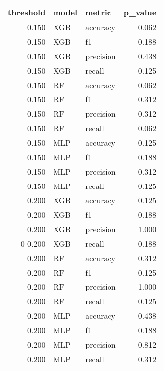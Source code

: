 \begin{tabular}{rllr}
\toprule
threshold & model & metric & p_value \\
\midrule
0.150 & XGB & accuracy & 0.062 \\
0.150 & XGB & f1 & 0.188 \\
0.150 & XGB & precision & 0.438 \\
0.150 & XGB & recall & 0.125 \\
0.150 & RF & accuracy & 0.062 \\
0.150 & RF & f1 & 0.312 \\
0.150 & RF & precision & 0.312 \\
0.150 & RF & recall & 0.062 \\
0.150 & MLP & accuracy & 0.125 \\
0.150 & MLP & f1 & 0.188 \\
0.150 & MLP & precision & 0.312 \\
0.150 & MLP & recall & 0.125 \\
0.200 & XGB & accuracy & 0.125 \\
0.200 & XGB & f1 & 0.188 \\
0.200 & XGB & precision & 1.000 \\0
0.200 & XGB & recall & 0.188 \\
0.200 & RF & accuracy & 0.312 \\
0.200 & RF & f1 & 0.125 \\
0.200 & RF & precision & 1.000 \\
0.200 & RF & recall & 0.125 \\
0.200 & MLP & accuracy & 0.438 \\
0.200 & MLP & f1 & 0.188 \\
0.200 & MLP & precision & 0.812 \\
0.200 & MLP & recall & 0.312 \\
\bottomrule
\end{tabular}
